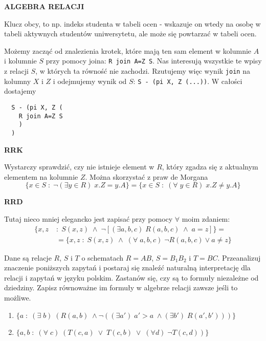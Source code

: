 \documentclass{article}
\begin{document}
\begin{solution}
  \textbf{\color{green}ALGEBRA RELACJI}

  Klucz obcy, to np. indeks studenta w tabeli ocen - wskazuje on wtedy na osobę w tabeli aktywnych studentów uniwersytetu, ale może się powtarzać w tabeli ocen.

  Możemy zacząć od znalezienia krotek, które mają ten sam element w kolumnie $A$ i kolumnie $S$ przy pomocy joina: \lstinline{R join A=Z S}. Nas interesują wszystkie te wpisy z relacji $S$, w których ta równość nie zachodzi. Rzutujemy więc wynik \lstinline{join} na kolumny $X$ i $Z$ i odejmujemy wynik od $S$: \lstinline{S - (pi X, Z (...))}. W całości dostajemy
  \begin{lstlisting}
  S - (pi X, Z (
    R join A=Z S
    )
  )
  \end{lstlisting}

  \textbf{\color{green}RRK}

  Wystarczy sprawdzić, czy nie istnieje element w $R$, który zgadza się z aktualnym elementem na kolumnie $Z$. Można skorzystać z praw de Morgana
  $$\{x\in S\;:\; \neg (\exists y\in R)\;x.Z=y.A\}=\{x\in S\;:\; (\forall\;y\in R)\;x.Z\neq y.A\}$$

  \textbf{\color{green}RRD}
  
  Tutaj nieco mniej elegancko jest zapisać przy pomocy $\forall$ moim zdaniem:
  \begin{align*}
    \{x, z\;&:\;S(x, z)\;\land\;\neg [(\exists a, b, c)\;R(a,b,c)\;\land \; a=z]\}=\\ 
    &=\{x,z\;:\;S(x,z)\;\land\;(\forall\;a, b, c)\;\neg R(a,b,c)\lor a\neq z\} 
  \end{align*}
\end{solution}

\begin{problem}
  Dane są relacje $R$, $S$ i $T$ o schematach $R=AB$, $S=B_1B_2$ i $T=BC$. Przeanalizuj znaczenie poniższych zapytań i postaraj się znaleźć naturalną interpretację dla relacji i zapytań w języku polskim. Zastanów się, czy są to formuły niezależne od dziedziny. Zapisz równoważne im formuły w algebrze relacji zawsze jeśli to możliwe.
  \begin{enumerate}
    \item $\{a\;:\;(\exists\;b)\;(R(a, b)\;\land \neg ((\exists a')\;a'>a\;\land (\exists b')\;R(a', b')))\}$
    \item $\{a, b\;:\;(\forall\;c)\;(T(c, a)\;\lor\;T(c, b)\;\lor\;(\forall d)\;\neg T(c, d))\}$
  \end{enumerate}
\end{problem}
\end{document}

